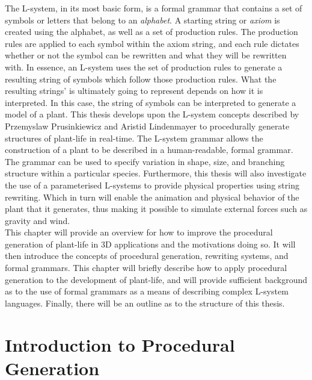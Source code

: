The L-system, in its most basic form, is a formal grammar that contains a set of symbols or letters that belong to an \textit{alphabet}. A starting string or \textit{axiom} is created using the alphabet, as well as a set of production rules. The production rules are applied to each symbol within the axiom string, and each rule dictates whether or not the symbol can be rewritten and what they will be rewritten with. In essence, an L-system uses the set of production rules to generate a resulting string of symbols which follow those production rules. What the resulting strings' is ultimately going to represent depends on how it is interpreted. In this case, the string of symbols can be interpreted to generate a model of a plant. This thesis develops upon the L-system concepts described by Przemyslaw Prusinkiewicz and Aristid Lindenmayer to procedurally generate structures of plant-life in real-time. The L-system grammar allows the construction of a plant to be described in a human-readable, formal grammar. The grammar can be used to specify variation in shape, size, and branching structure within a particular species. Furthermore, this thesis will also investigate the use of a parameterised L-systems to provide physical properties using string rewriting. Which in turn will enable the animation and physical behavior of the plant that it generates, thus making it possible to simulate external forces such as gravity and wind.\\

This chapter will provide an overview for how to improve the procedural generation of plant-life in 3D applications and the motivations doing so. It will then introduce the concepts of procedural generation, rewriting systems, and formal grammars. This chapter will briefly describe how to apply procedural generation to the development of plant-life, and will provide sufficient background as to the use of formal grammars as a means of describing complex L-system languages. Finally, there will be an outline as to the structure of this thesis.

\section{Introduction to Procedural Generation}

